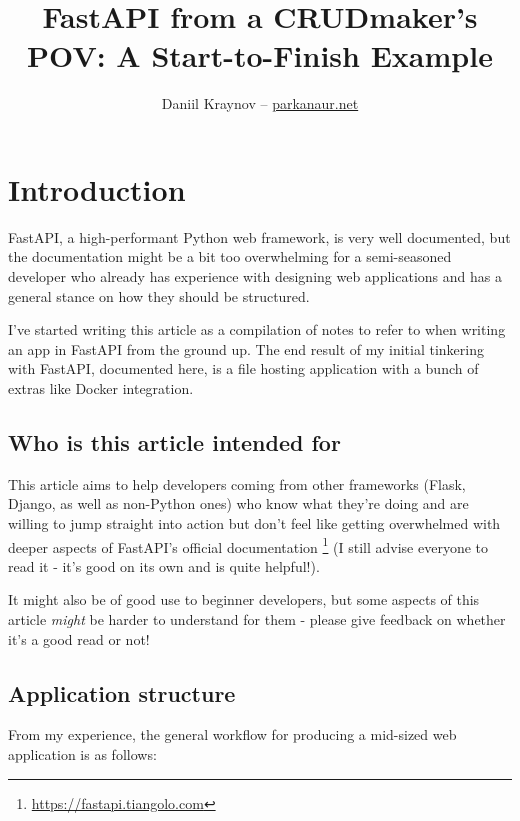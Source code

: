 \documentclass[14pt]{extarticle}
\title{FastAPI from a CRUDmaker's POV: A Start-to-Finish Example}
\author{Daniil Kraynov -- \href{https://parkanaur.net}{parkanaur.net}}
\newcommand{\flink}[1]{\footnote{\href{#1}{#1}}}
\begin{document}
\maketitle

{\hypersetup{linkcolor=black}
\tableofcontents}

\section{Introduction}

FastAPI, a high-performant Python web framework, is very well documented, but the documentation might be a bit too overwhelming for a semi-seasoned developer who already has experience with designing web applications and has a general stance on how they should be structured.

I've started writing this article as a compilation of notes to refer to when writing an app in FastAPI from the ground up. The end result of my initial tinkering with FastAPI, documented here, is a file hosting application with a bunch of extras like Docker integration.

\subsection{Who is this article intended for}

This article aims to help developers coming from other frameworks (Flask, Django, as well as non-Python ones) who know what they're doing and are willing to jump straight into action but don't feel like getting overwhelmed with deeper aspects of FastAPI's official documentation \flink{https://fastapi.tiangolo.com} (I still advise everyone to read it - it's good on its own and is quite helpful!).

It might also be of good use to beginner developers, but some aspects of this article \textit{might} be harder to understand for them - please give feedback on whether it's a good read or not!

\subsection{Application structure}

From my experience, the general workflow for producing a mid-sized web application is as follows:
\end{document}
